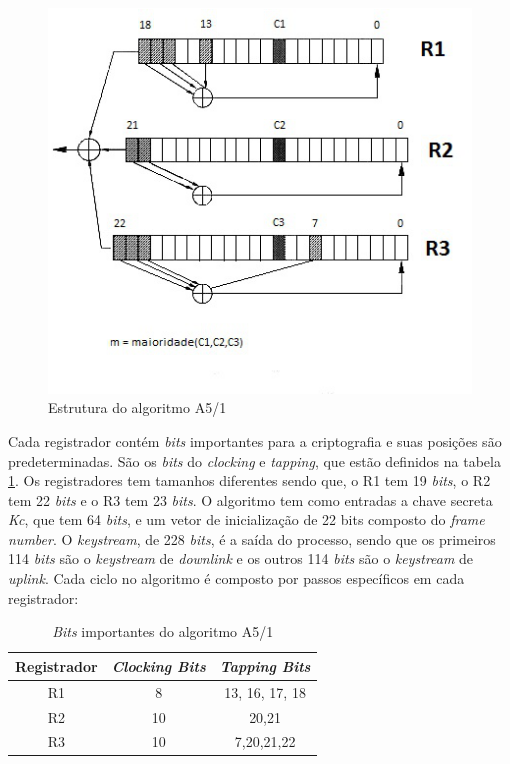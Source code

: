 \begin{figure}[h]
\centering
\includegraphics[keepaspectratio=true,scale=0.9]
    {figuras/a5_1.eps}
    \caption[Estrutura do algoritmo A5/1]{Estrutura do algoritmo A5/1\protect\footnotemark} 
\end{figure}

Cada registrador contém \textit{bits} importantes para a criptografia e suas posições são predeterminadas. São os \textit{bits} do \textit{clocking} e \textit{tapping}, que estão definidos na tabela \ref{important-bits}. Os registradores tem tamanhos diferentes sendo que, o R1 tem 19 \textit{bits}, o R2 tem 22 \textit{bits} e o R3 tem 23 \textit{bits}. O algoritmo tem como entradas a chave secreta \textit{Kc}, que tem 64 \textit{bits}, e um vetor de inicialização de 22 bits composto do \textit{frame number}. O \textit{keystream}, de 228 \textit{bits}, é a saída do processo, sendo que os primeiros 114 \textit{bits} são o \textit{keystream} de \textit{downlink} e os outros 114 \textit{bits} são o \textit{keystream} de \textit{uplink}. Cada ciclo no algoritmo é composto por passos específicos em cada registrador:

\begin{table}[h]
\centering
	\begin{tabular}{c c c}
	\toprule
		Registrador & \textit{Clocking Bits} & \textit{Tapping Bits} \\ \hline
		R1 & 8 & 13, 16, 17, 18 \\ \hline
		R2 & 10 & 20,21 \\ \hline
		R3 & 10 & 7,20,21,22 \\ \hline	
	\end{tabular}
	\caption{\textit{Bits} importantes do algoritmo A5/1}
	\label{important-bits}
\end{table}

